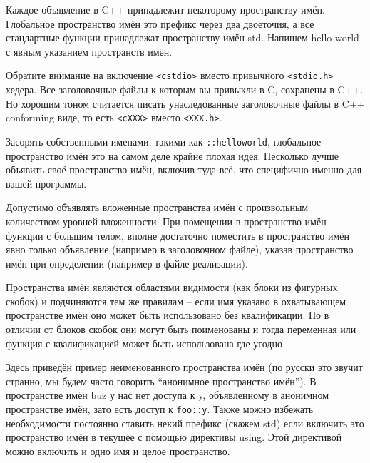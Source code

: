 \documentclass[a4paper,12pt,oneside]{article}
\begin{document}
Каждое объявление в C++ принадлежит некоторому пространству имён. Глобальное пространство имён это префикс через два двоеточия, а все стандартные функции принадлежат пространству имён std. Напишем hello world с явным указанием пространств имён.



Обратите внимание на включение \lstinline!<cstdio>! вместо привычного \lstinline!<stdio.h>! хедера. Все заголовочные файлы к которым вы привыкли в C, сохранены в C++. Но хорошим тоном считается писать унаследованные заголовочные файлы в C++ conforming виде, то есть \lstinline!<cXXX>! вместо \lstinline!<XXX.h>!.

Засорять собственными именами, такими как \lstinline!::helloworld!, глобальное пространство имён это на самом деле крайне плохая идея. Несколько лучше объявить своё пространство имён, включив туда всё, что специфично именно для вашей программы.



Допустимо объявлять вложенные пространства имён с произвольным количеством уровней вложенности. При помещении в пространство имён функции с большим телом, вполне достаточно поместить в пространство имён явно только объявление (например в заголовочном файле), указав пространство имён при определении (например в файле реализации).



Пространства имён являются областями видимости (как блоки из фигурных скобок) и подчиняются тем же правилам – если имя указано в охватывающем пространстве имён оно может быть использовано без квалификации. Но в отличии от блоков скобок они могут быть поименованы и тогда переменная или функция с квалификацией может быть использована где угодно



Здесь приведён пример неименованного пространства имён (по русски это звучит странно, мы будем часто говорить ``анонимное пространство имён''). В пространстве имён buz у нас нет доступа к y, объявленному в анонимном пространстве имён, зато есть доступ к \lstinline!foo::y!. Также можно избежать необходимости постоянно ставить некий префикс (скажем std) если включить это пространство имён в текущее с помощью директивы using. Этой директивой можно включить и одно имя и целое пространство.
\end{document}
